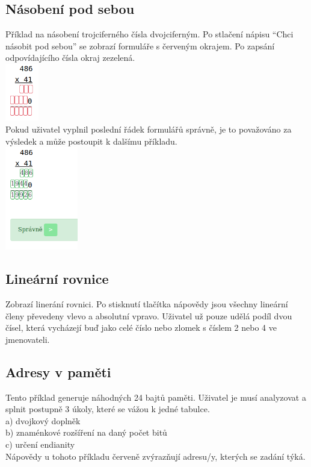 \documentclass[
]{article}
\begin{document}
\subsection{Násobení pod sebou}

Příklad na násobení trojciferného čísla dvojciferným. Po stlačení nápisu
``Chci násobit pod sebou'' se zobrazí formuláře s červeným okrajem. Po
zapsání odpovídajícího čísla okraj zezelená.\\
\includegraphics[height=2.5cm]{../../doc-images/multiblank.png}\\
Pokud uživatel vyplnil
poslední řádek formulářů správně, je to považováno za výsledek a může
postoupit k dalšímu příkladu.\\
\includegraphics[height=4.5cm]{../../doc-images/multifull.png}\\

\subsection{Lineární rovnice}

Zobrazí linerání rovnici. Po stisknutí tlačítka nápovědy jsou všechny
lineární členy převedeny vlevo a absolutní vpravo. Uživatel už pouze
udělá podíl dvou čísel, která vycházejí buď jako celé číslo nebo zlomek
s číslem 2 nebo 4 ve jmenovateli.

\subsection{Adresy v paměti}

Tento příklad generuje náhodných 24 bajtů paměti. Uživatel je musí
analyzovat a splnit postupně 3 úkoly, které se vážou k jedné tabulce.\\
a) dvojkový doplněk\\
b) znaménkové rozšíření na daný počet bitů\\
c) určení endianity\\
Nápovědy u tohoto příkladu červeně zvýrazňují adresu/y, kterých se zadání týká.
\end{document}
